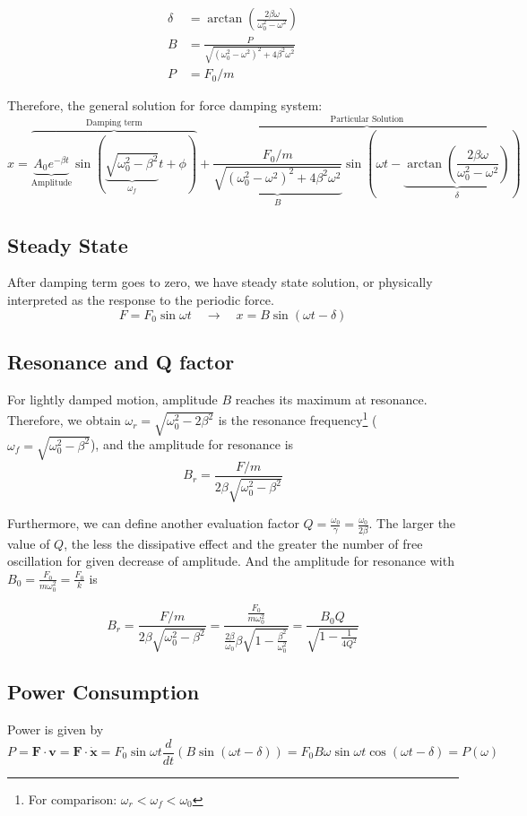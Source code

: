 \documentclass[UTF8]{book}
\begin{document}
\begin{align*}
\delta &=\arctan \left(\frac{2\beta \omega }{\omega _0^2-\omega ^2}\right)\\
B &=\frac{P}{\sqrt{\left(\omega _0^2-\omega ^2\right)^2+4\beta ^2\omega ^2}}\\
P &={F_0}/{m}
\end{align*}

Therefore, the general solution for force damping system:
\[x=\overbrace{\underbrace{A_0e^{-\beta t}}_\text{Amplitude}\sin (\underbrace{\sqrt{\omega _0^2-\beta ^2}}_{\omega _f} t+\phi )}^\text{Damping term}+\overbrace{\underbrace{\frac{{F_0}/{m}}{\sqrt{\left(\omega _0^2-\omega ^2\right)^2+4\beta ^2\omega ^2}}}_{B}\sin (\omega t-\underbrace{\arctan \left(\frac{2\beta \omega }{\omega _0^2-\omega ^2}\right)}_{\delta })}^\text{Particular Solution}\]

\subsection{Steady State}
After damping term goes to zero, we have steady state solution, or physically interpreted as the response to the periodic force.
\[F=F_0\sin \omega t \quad \to \quad x=B\sin (\omega t-\delta )\]


\subsection{Resonance and Q factor}
For lightly damped motion, amplitude $B$ reaches its maximum at resonance. Therefore, we obtain $\omega _r=\sqrt{\omega _0^2-2\beta ^2}$ is the resonance frequency\footnote{For comparison: $\omega _r<\omega _f<\omega _0$} ($\omega _f=\sqrt{\omega _0^2-\beta ^2}$), and the amplitude for resonance is
\[B_r=\frac{F/m}{2\beta \sqrt{\omega _0^2-\beta ^2}}\]

Furthermore, we can define another evaluation factor $Q=\frac{\omega _0}{\gamma }=\frac{\omega _0}{2\beta }$. The larger the value of $Q$, the less the dissipative effect and the greater the number of free oscillation for given decrease of amplitude. And the amplitude for resonance with $B_0=\frac{F_0}{m\omega _0^2}=\frac{F_0}{k}$ is

\[B_r=\frac{F/m}{2\beta \sqrt{\omega _0^2-\beta ^2}}=\frac{\frac{F_0}{m\omega _0^2}}{\frac{2\beta }{\omega _0}\beta \sqrt{1-\frac{\beta ^2}{\omega _0^2}}}=\frac{B_0Q}{\sqrt{1-\frac{1}{4Q^2}}}\]


\subsection{Power Consumption}
Power is given by 
\[P=\mathbf{F}\cdot \mathbf{v}=\mathbf{F}\cdot \dot{\mathbf{x}}=F_0\sin \omega t \frac{d}{dt}\left(B\sin (\omega t-\delta )\right)=F_0B\omega \sin \omega t\cos (\omega t-\delta )=P(\omega )\]
\end{document}
